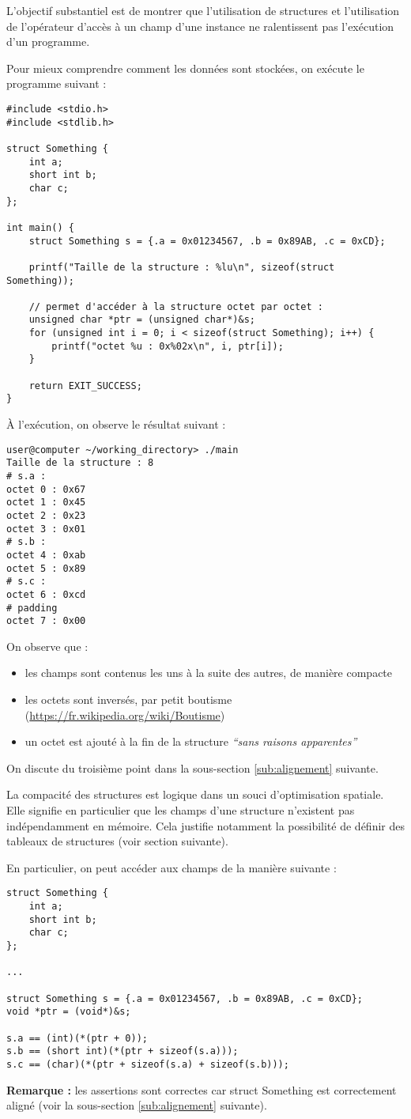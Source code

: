 \documentclass[../../../main.tex]{subfiles}
\begin{document}
L'objectif substantiel est de montrer que l'utilisation de structures et l'utilisation de l'opérateur d'accès à un champ d'une instance ne ralentissent pas l'exécution d'un programme.

Pour mieux comprendre comment les données sont stockées, on exécute le programme suivant :
\begin{verbatim}
#include <stdio.h>
#include <stdlib.h>

struct Something {
	int a;
	short int b;
	char c;
};

int main() {
	struct Something s = {.a = 0x01234567, .b = 0x89AB, .c = 0xCD};

	printf("Taille de la structure : %lu\n", sizeof(struct Something));

	// permet d'accéder à la structure octet par octet :
	unsigned char *ptr = (unsigned char*)&s; 
	for (unsigned int i = 0; i < sizeof(struct Something); i++) {
		printf("octet %u : 0x%02x\n", i, ptr[i]);
	}

	return EXIT_SUCCESS;
}
\end{verbatim}
À l'exécution, on observe le résultat suivant :
\begin{verbatim}
user@computer ~/working_directory> ./main
Taille de la structure : 8
# s.a :
octet 0 : 0x67
octet 1 : 0x45
octet 2 : 0x23
octet 3 : 0x01
# s.b :
octet 4 : 0xab
octet 5 : 0x89
# s.c :
octet 6 : 0xcd
# padding
octet 7 : 0x00
\end{verbatim}
On observe que :
\begin{itemize}
	\item les champs sont contenus les uns à la suite des autres, de manière compacte
	\item les octets sont inversés, par petit boutisme (\url{https://fr.wikipedia.org/wiki/Boutisme})
	\item un octet est ajouté à la fin de la structure \textit{``sans raisons apparentes''}
\end{itemize}
On discute du troisième point dans la sous-section \ref{sub:alignement} suivante.

La compacité des structures est logique dans un souci d'optimisation spatiale. Elle signifie en particulier que les champs d'une structure n'existent pas indépendamment en mémoire. Cela justifie notamment la possibilité de définir des tableaux de structures (voir section suivante).

En particulier, on peut accéder aux champs de la manière suivante :
\begin{verbatim}
struct Something {
	int a;
	short int b;
	char c;
};

...

struct Something s = {.a = 0x01234567, .b = 0x89AB, .c = 0xCD};
void *ptr = (void*)&s;

s.a == (int)(*(ptr + 0));
s.b == (short int)(*(ptr + sizeof(s.a)));
s.c == (char)(*(ptr + sizeof(s.a) + sizeof(s.b)));
\end{verbatim}
\textbf{Remarque :} les assertions sont correctes car \textsf{struct Something} est correctement aligné (voir la sous-section \ref{sub:alignement} suivante).
\end{document}
